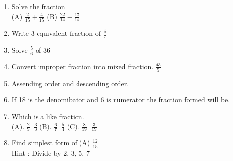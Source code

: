\begin{enumerate}

    \item Solve the fraction \\ (A) { \large \( \frac{2}{15} + \frac{4}{15} \) }
            \qquad (B) { \large \( \frac{22}{14} - \frac{12}{14} \) }

    \item Write 3 equivalent fraction of  { \large \( \frac{5}{7} \) }

    \item Solve { \large \( \frac{5}{6} \) } of 36

    \item Convert improper fraction into mixed fraction. { \large \( \frac{43}{5} \) }

    \item Assending order and descending order.

    \item If 18 is the denomibator and 6 is numerator the fraction formed will be.

    \item Which is a like fraction.
        \\ (A). { \large \( \frac{2}{9} \; \; \frac{3}{8} \) } \qquad
           (B). { \large \( \frac{6}{7} \; \; \frac{5}{4} \) } \qquad
           (C). { \large \( \frac{8}{19} \; \; \frac{3}{19} \) } \qquad

    \item Find simplest form of (A) { \large \( \frac{12}{15} \) }
          \\ Hint : Divide by 2, 3, 5, 7

\end{enumerate}
